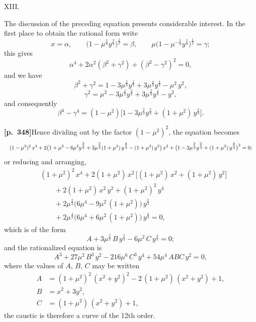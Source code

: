 \documentclass[11pt]{article}
\begin{document}
\medskip
\begin{center}XIII.\end{center}

The discussion of the preceding equation presents considerable interest. In the first place to obtain the rational form write
\[
x = \alpha,\qquad \bigl(1 - \mu^{\tfrac{2}{3}}y^{\tfrac{2}{3}}\bigr)^{\tfrac{1}{2}} = \beta,\qquad \mu\bigl(1 - \mu^{-\tfrac{2}{3}}y^{\tfrac{2}{3}}\bigr)^{\tfrac{1}{2}} = \gamma;
\]
this gives
\[
\alpha^{4} + 2\alpha^{2}(\beta^{2} + \gamma^{2}) + (\beta^{2} - \gamma^{2})^{2} = 0,
\]
and we have
\[
\beta^{2} + \gamma^{2} = 1 - 3\mu^{\tfrac{2}{3}}y^{\tfrac{2}{3}} + 3\mu^{\tfrac{4}{3}}y^{\tfrac{4}{3}} - \mu^{2}\,y^{2},
\]
\[
\gamma^{2} = \mu^{2} - 3\mu^{\tfrac{4}{3}}y^{\tfrac{2}{3}} + 3\mu^{\tfrac{2}{3}}y^{\tfrac{4}{3}} - y^{2},
\]
and consequently
\[
\beta^{4} - \gamma^{4} = (1 - \mu^{2})\bigl[1 - 3\mu^{\tfrac{2}{3}}y^{\tfrac{2}{3}} + (1 + \mu^{2})\,y^{\tfrac{4}{3}}\bigr].
\]

\noindent\textbf{[p.~348]}\quad Hence dividing out by the factor $(1 - \mu^{2})^{2}$, the equation becomes
\[
\resizebox{\textwidth}{!}{$\displaystyle (1 - \mu^{2})^{2}\,x^{4} + 2\bigl(1 + \mu^{2} - 6\mu^{2}y^{\tfrac{2}{3}} + 3\mu^{\tfrac{2}{3}}(1 + \mu^{2})\,y^{\tfrac{4}{3}} - (1 + \mu^{2})\,y^{2}\bigr)\,x^{2} + \bigl(1 - 3\mu^{\tfrac{2}{3}}y^{\tfrac{2}{3}} + (1 + \mu^{2})\,y^{\tfrac{4}{3}}\bigr)^{2} = 0;$}
\]
or reducing and arranging,
\begin{align*}
&(1 + \mu^{2})^{2}\,x^{4} + 2(1 + \mu^{2})\,x^{2}\,\bigl[(1 + \mu^{2})\,x^{2} + (1 + \mu^{2})\,y^{2}\bigr]\\
&\qquad + 2(1 + \mu^{2})\,x^{2}\,y^{2} + (1 + \mu^{2})^{2}\,y^{4}\\
&\qquad + 2\mu^{\tfrac{2}{3}}\bigl(6\mu^{4} - 9\mu^{2}\,(1 + \mu^{2})\bigr)\,y^{\tfrac{2}{3}}\\
&\qquad + 2\mu^{\tfrac{4}{3}}\bigl(6\mu^{4} + 6\mu^{2}\,(1 + \mu^{2})\bigr)\,y^{\tfrac{4}{3}} = 0,
\end{align*}
which is of the form
\[
A + 3\mu^{\tfrac{2}{3}}\,B\,y^{\tfrac{2}{3}} - 6\mu^{2}\,C\,y^{\tfrac{4}{3}} = 0;
\]
and the rationalized equation is
\[
A^{3} + 27\mu^{2}\,B^{3}\,y^{2} - 216\mu^{6}\,C^{3}\,y^{4} + 54\mu^{4}\,ABC\,y^{2} = 0,
\]
where the values of $A$, $B$, $C$ may be written
\begin{align*}
A &= (1 + \mu^{2})^{2}\,(x^{2} + y^{2})^{2} - 2\,(1 + \mu^{2})\,(x^{2} + y^{2}) + 1,\\
B &= x^{2} + 3y^{2},\\
C &= (1 + \mu^{2})\,(x^{2} + y^{2}) + 1,
\end{align*}
the caustic is therefore a curve of the 12th order.
\end{document}

